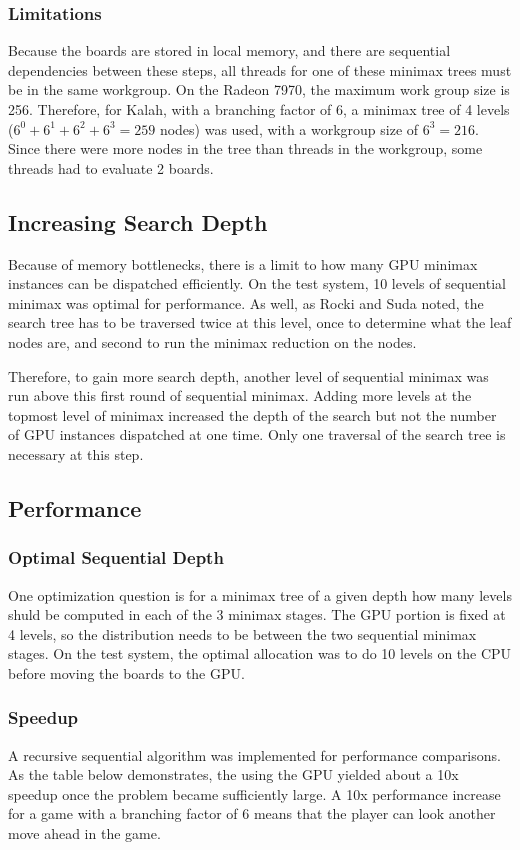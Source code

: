 \documentclass{article}
\begin{document}
\subsubsection{Limitations}
Because the boards are stored in local memory, and there are sequential dependencies between these steps, all threads for one of these minimax trees must be in the same workgroup. On the Radeon 7970, the maximum work group size is 256. Therefore, for Kalah, with a branching factor of 6, a minimax tree of 4 levels ($6^0 + 6^1 + 6^2 + 6^3 = 259$ nodes) was used, with a workgroup size of $6^3 = 216$. Since there were more nodes in the tree than threads in the workgroup, some threads had to evaluate 2 boards.

\subsection{Increasing Search Depth}
Because of memory bottlenecks, there is a limit to how many GPU minimax instances can be dispatched efficiently. On the test system, 10 levels of sequential minimax was optimal for performance. As well, as Rocki and Suda\cite{rockisuda10} noted, the search tree has to be traversed twice at this level, once to determine what the leaf nodes are, and second to run the minimax reduction on the nodes.

Therefore, to gain more search depth, another level of sequential minimax was run above this first round of sequential minimax. Adding more levels at the topmost level of minimax increased the depth of the search but not the number of GPU instances dispatched at one time. Only one traversal of the search tree is necessary at this step.

\subsection{Performance}
\subsubsection{Optimal Sequential Depth}
One optimization question is for a minimax tree of a given depth how many levels shuld be computed in each of the 3 minimax stages. The GPU portion is fixed at 4 levels, so the distribution needs to be between the two sequential minimax stages. On the test system, the optimal allocation was to do 10 levels on the CPU before moving the boards to the GPU.

\subsubsection{Speedup}
A recursive sequential algorithm was implemented for performance comparisons. As the table below demonstrates, the using the GPU yielded about a 10x speedup once the problem became sufficiently large. A 10x performance increase for a game with a branching factor of 6 means that the player can look another move ahead in the game.
\end{document}
